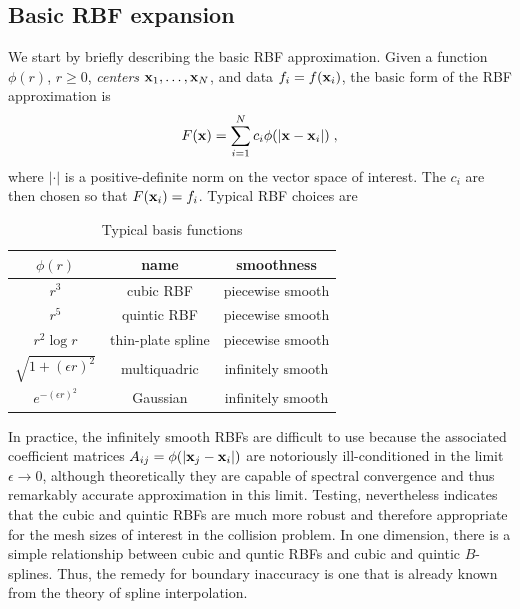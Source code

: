 \subsection{Basic RBF expansion}

\newcommand\xv{{\bf x}}
\newcommand\xc{{\hat {\bf x}}}
\newcommand\xih{{\hat\xi}}

We start by briefly describing the basic RBF approximation.
Given a function $\phi(r)$, $r \ge 0$, {\it centers} 
$\xv_1,\ldots,\xv_N$, and data $f_i = f(\xv_i)$, the basic 
form of the RBF approximation is
%
\begin{equation}
F(\xv) = \sum_{i=1}^N c_i \phi(|\xv-\xv_i|) \; ,
\label{eq.basicrbf}
\end{equation}
%
where $|\cdot|$ is a positive-definite norm on the vector 
space of interest.  The $c_i$ are then chosen so that 
$F(\xv_i) = f_i$.  Typical RBF choices are 

\begin{table}[h]
\begin{center}
\caption{Typical basis functions}
\begin{tabular}{c c c} \hline\hline
 $\phi(r)$ & name & smoothness \\ \hline
 $r^3$ & cubic RBF & piecewise smooth \\ 
 $r^5$ & quintic RBF & piecewise smooth \\ 
 $r^2 \log r$ & thin-plate spline & piecewise smooth \\ 
 $\sqrt{1+(\epsilon r)^2}$ & multiquadric & infinitely smooth \\ 
 $e^{-(\epsilon r)^2}$ & Gaussian & infinitely smooth \\ 
\hline\hline
\end{tabular}
\label{tab.error}
\end{center}
\end{table}

In practice, the infinitely smooth RBFs are difficult to use 
because the associated coefficient matrices $A_{ij} = \phi(|\xv_j-\xv_i|)$ 
are notoriously ill-conditioned in the limit $\epsilon \rightarrow 0$, 
although theoretically they are capable of spectral convergence 
and thus remarkably accurate approximation in this limit.  Testing, 
nevertheless indicates that the cubic and quintic RBFs are much 
more robust and therefore appropriate for the mesh sizes of interest 
in the collision problem.  In one dimension, there is a simple 
relationship between cubic and quntic RBFs and cubic and quintic 
$B$-splines.  Thus, the remedy for boundary inaccuracy is one that 
is already known from the theory of spline interpolation. 

